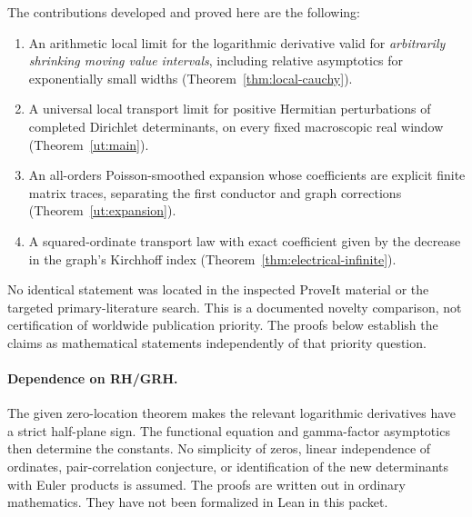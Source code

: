 The contributions developed and proved here are the following:
\begin{enumerate}
\item An arithmetic local limit for the logarithmic derivative valid for
\emph{arbitrarily shrinking moving value intervals}, including relative
asymptotics for exponentially small widths
(Theorem~\ref{thm:local-cauchy}).
\item A universal local transport limit for positive Hermitian
perturbations of completed Dirichlet determinants, on every fixed
macroscopic real window (Theorem~\ref{ut:main}).
\item An all-orders Poisson-smoothed expansion whose coefficients are
explicit finite matrix traces, separating the first conductor and graph
corrections (Theorem~\ref{ut:expansion}).
\item A squared-ordinate transport law with exact coefficient given by
the decrease in the graph's Kirchhoff index
(Theorem~\ref{thm:electrical-infinite}).
\end{enumerate}
No identical statement was located in the inspected ProveIt material or
the targeted primary-literature search.  This is a documented novelty
comparison, not certification of worldwide publication priority.  The
proofs below establish the claims as mathematical statements independently
of that priority question.

\paragraph{Dependence on RH/GRH.}
The given zero-location theorem makes the relevant logarithmic derivatives
have a strict half-plane sign.  The functional equation and gamma-factor
asymptotics then determine the constants.  No simplicity of zeros,
linear independence of ordinates, pair-correlation conjecture, or
identification of the new determinants with Euler products is assumed.
The proofs are written out in ordinary mathematics.  They have not been
formalized in Lean in this packet.
